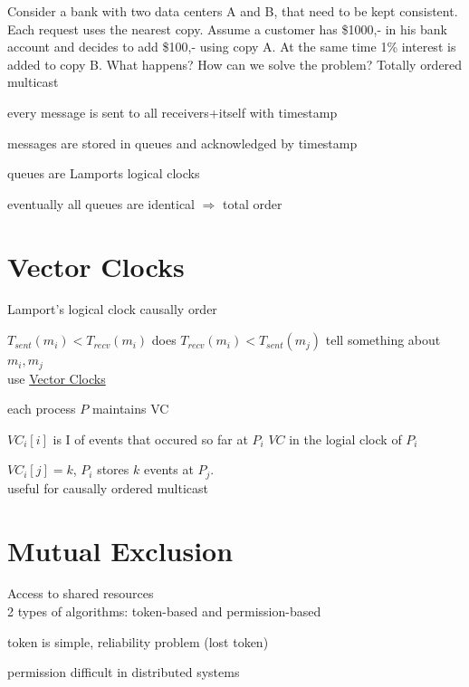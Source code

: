 \documentclass[ngerman,a4paper]{report}
\begin{document}
Consider a bank with two data centers A and B, that need to be kept consistent. Each request uses the nearest copy.
Assume a customer has \$1000,- in his bank account and decides to add \$100,- using copy A. At the same time 1\% interest is added to copy B. What happens? How can we solve the problem?
Totally ordered multicast

every message is sent to all receivers+itself with timestamp\\
\begin{compactitem}
	\item messages are stored in queues  and acknowledged by timestamp
	\item queues are Lamports logical clocks
	\item eventually all queues are identical $\Rightarrow$ total order
\end{compactitem}

\chapter{Vector Clocks}
\begin{compactitem}
	\item Lamport's logical clock causally order
	\item $T_{sent}(m_i) < T_{recv} (m_i)$
		does $T_{recv} (m_i) < T_{sent} (m_j)$
		tell something about $m_i,m_j$\\
		use \underline{Vector Clocks}
	\item each process $P$ maintains VC
		\begin{compactenum}
			\item $VC_i[i]$ is I of events that occured so far at $P_i$
				$VC$ in the logial clock of $P_i$
			\item $VC_i[j]=k$, $P_i$ stores $k$ events at $P_j$.\\
				useful for causally ordered multicast\\
		\end{compactenum}
\end{compactitem}
\chapter{Mutual Exclusion}
Access to shared resources\\
2 types of algorithms: token-based and permission-based
\begin{compactitem}
	\item token is simple, reliability problem (lost token)
	\item permission difficult in distributed systems
\end{compactitem}
\end{document}
